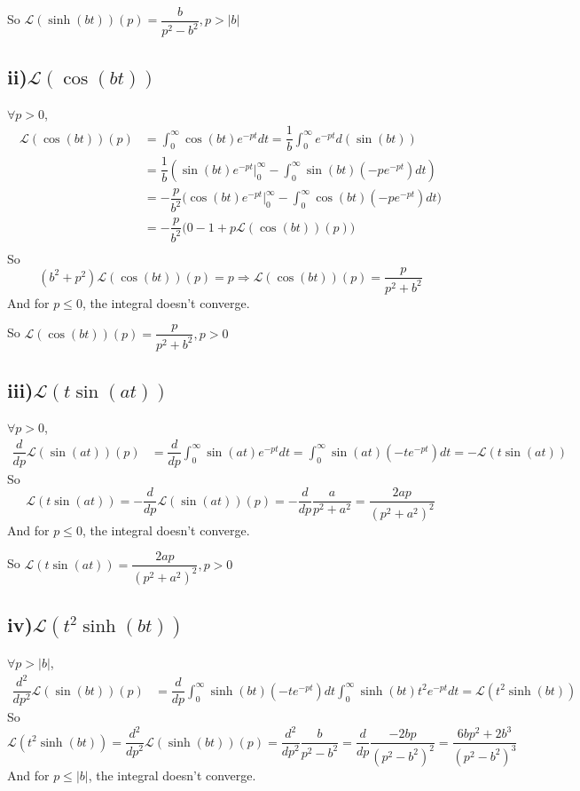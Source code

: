 \documentclass[a4paper,12pt,titlepage]{article}
\begin{document}
So $\mathcal{L}(\sinh (bt))(p)=\dfrac{b}{p^2-b^2}, p>|b|$

\subsection*{ii)$\mathcal{L}(\cos(bt))$}
$\forall p>0$,
\begin{align*}
\mathcal{L}(\cos (bt))(p)&=\int_0^{\infty}\cos(bt)e^{-pt}dt=\dfrac{1}{b}\int_0^{\infty}e^{-pt}d(\sin (bt))\\
&=\dfrac{1}{b}(\sin(bt)e^{-pt}\big|_0^{\infty}-\int_0^{\infty}\sin(bt)(-pe^{-pt})dt)\\
&=-\dfrac{p}{b^2}\big(\cos(bt)e^{-pt}\big|_0^{\infty}-\int_0^{\infty}\cos(bt)(-pe^{-pt})dt\big)\\
&=-\dfrac{p}{b^2}\big(0-1+p\mathcal{L}(\cos (bt))(p)\big)\\
\end{align*}
So 
$$(b^2+p^2)\mathcal{L}(\cos (bt))(p)=p\Rightarrow \mathcal{L}(\cos (bt))(p)=\dfrac{p}{p^2+b^2}$$
And for $ p\leqslant0$, the integral doesn't converge.

So $\mathcal{L}(\cos (bt))(p)=\dfrac{p}{p^2+b^2}, p>0$

\subsection*{iii)$\mathcal{L}(t\sin(at))$}
$\forall p>0$,
\begin{align*}
\dfrac{d}{dp}\mathcal{L}(\sin (at))(p)&=\dfrac{d}{dp}\int_0^{\infty}\sin(at)e^{-pt}dt=\int_0^{\infty}\sin (at)(-te^{-pt})dt=-\mathcal{L}(t\sin(at))
\end{align*}
So 
$$\mathcal{L}(t\sin(at))=-\dfrac{d}{dp}\mathcal{L}(\sin (at))(p)=-\dfrac{d}{dp}\dfrac{a}{p^2+a^2}=\dfrac{2ap}{(p^2+a^2)^2}$$
And for $ p\leqslant0$, the integral doesn't converge.

So $\mathcal{L}(t\sin(at))=\dfrac{2ap}{(p^2+a^2)^2}, p>0$

\subsection*{iv)$\mathcal{L}(t^2\sinh(bt))$}
$\forall p>|b|$,
\begin{align*}
\dfrac{d^2}{dp^2}\mathcal{L}(\sin (bt))(p)&=\dfrac{d}{dp}\int_0^{\infty}\sinh (bt)(-te^{-pt})dt\int_0^{\infty}\sinh (bt)t^2e^{-pt}dt=\mathcal{L}(t^2\sinh(bt))
\end{align*}
So 
$$\mathcal{L}(t^2\sinh(bt))=\dfrac{d^2}{dp^2}\mathcal{L}(\sinh (bt))(p)=\dfrac{d^2}{dp^2}\dfrac{b}{p^2-b^2}=\dfrac{d}{dp}\dfrac{-2bp}{(p^2-b^2)^2}=\dfrac{6bp^2+2b^3}{(p^2-b^2)^3}$$
And for $ p\leqslant|b|$, the integral doesn't converge.
\end{document}

